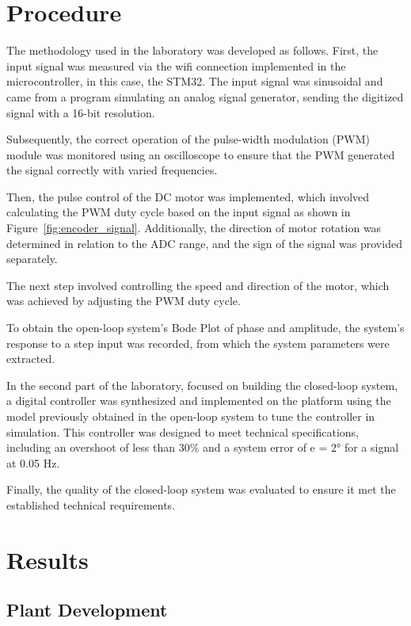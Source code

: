 \documentclass[conference,onecolumn]{IEEEtran}
\begin{document}
\section{Procedure}
The methodology used in the laboratory was developed as follows. First, the input signal was measured via the wifi connection implemented in the microcontroller, in this case, the STM32. The input signal was sinusoidal and came from a program simulating an analog signal generator, sending the digitized signal with a 16-bit resolution.

Subsequently, the correct operation of the pulse-width modulation (PWM) module was monitored using an oscilloscope to ensure that the PWM generated the signal correctly with varied frequencies.

Then, the pulse control of the DC motor was implemented, which involved calculating the PWM duty cycle based on the input signal as shown in Figure~\ref{fig:encoder_signal}. Additionally, the direction of motor rotation was determined in relation to the ADC range, and the sign of the signal was provided separately.

The next step involved controlling the speed and direction of the motor, which was achieved by adjusting the PWM duty cycle.

To obtain the open-loop system's Bode Plot of phase and amplitude, the system's response to a step input was recorded, from which the system parameters were extracted.

In the second part of the laboratory, focused on building the closed-loop system, a digital controller was synthesized and implemented on the platform using the model previously obtained in the open-loop system to tune the controller in simulation. This controller was designed to meet technical specifications, including an overshoot of less than 30\% and a system error of e = 2° for a signal at 0.05 Hz.

Finally, the quality of the closed-loop system was evaluated to ensure it met the established technical requirements.

\section{Results}

\subsection{Plant Development}
\end{document}
